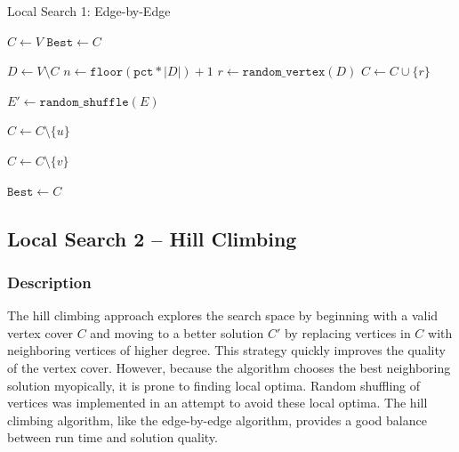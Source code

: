 \documentclass{sig-alternate-05-2015}
\begin{document}
\begin{algorithm}
\LinesNumbered
\DontPrintSemicolon
\BlankLine
 

\caption{Local Search 1: Edge-by-Edge}

\BlankLine
\Begin
{
	$C \leftarrow V$\;
	$\texttt{Best} \leftarrow C$\;
    {
    		{
        		$D \leftarrow V \setminus C$\;
        		$n \leftarrow \texttt{floor}(\texttt{pct} * |D|)+1$\;
        		{
        			$r \leftarrow \texttt{random\_vertex}(D)$\;
        			$C \leftarrow C \cup \lbrace r \rbrace$\;
        		}
        		
        }
        $ E' \leftarrow \texttt{random\_shuffle}(E)$\;
        {
        		{
        			{
        				{
        					$C \leftarrow C \setminus \lbrace u \rbrace$\;
        				}
				}
			
				{
					{
						$C \leftarrow C \setminus \lbrace v \rbrace$\;
					}
				}
				
        			
        		}
        }
        {
        		$\texttt{Best} \leftarrow C$\;
        }
    }
}

\end{algorithm}

 
\subsection{Local Search 2 -- Hill Climbing}
\subsubsection{Description}
The hill climbing approach explores the search space by beginning with a valid vertex cover $C$ and moving to a better solution $C'$ by replacing vertices in $C$ with neighboring vertices of higher degree.  This strategy quickly improves the quality of the vertex cover. However, because the algorithm chooses the best neighboring solution myopically, it is prone to finding local optima. Random shuffling of vertices was implemented in an attempt to avoid these local optima.  The hill climbing algorithm, like the edge-by-edge algorithm, provides a good balance between run time and solution quality.
\par
\end{document}
